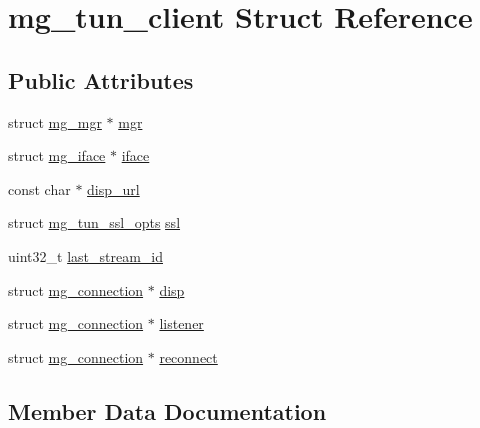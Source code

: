 \hypertarget{structmg__tun__client}{}\section{mg\+\_\+tun\+\_\+client Struct Reference}
\label{structmg__tun__client}
\subsection*{Public Attributes}
\begin{DoxyCompactItemize}
\item 
struct \hyperlink{structmg__mgr}{mg\+\_\+mgr} $\ast$ \hyperlink{structmg__tun__client_a6d8252150b0c44c00f00d2e5ef20d88b_a6d8252150b0c44c00f00d2e5ef20d88b}{mgr}
\item 
struct \hyperlink{structmg__iface}{mg\+\_\+iface} $\ast$ \hyperlink{structmg__tun__client_ad83d50edc28747fbaae7dc914a908e7f_ad83d50edc28747fbaae7dc914a908e7f}{iface}
\item 
const char $\ast$ \hyperlink{structmg__tun__client_ae2702c91d02403ab47e96cfa00748171_ae2702c91d02403ab47e96cfa00748171}{disp\+\_\+url}
\item 
struct \hyperlink{structmg__tun__ssl__opts}{mg\+\_\+tun\+\_\+ssl\+\_\+opts} \hyperlink{structmg__tun__client_a8e2503ec635c4e69b547b6aed64bed37_a8e2503ec635c4e69b547b6aed64bed37}{ssl}
\item 
uint32\+\_\+t \hyperlink{structmg__tun__client_a8f57544d695fdb0377020fe4288e2403_a8f57544d695fdb0377020fe4288e2403}{last\+\_\+stream\+\_\+id}
\item 
struct \hyperlink{structmg__connection}{mg\+\_\+connection} $\ast$ \hyperlink{structmg__tun__client_ab5de89e0196eb61c58d0d015c2355c21_ab5de89e0196eb61c58d0d015c2355c21}{disp}
\item 
struct \hyperlink{structmg__connection}{mg\+\_\+connection} $\ast$ \hyperlink{structmg__tun__client_a023920ae1a96f98f546ea70df7d710df_a023920ae1a96f98f546ea70df7d710df}{listener}
\item 
struct \hyperlink{structmg__connection}{mg\+\_\+connection} $\ast$ \hyperlink{structmg__tun__client_a49657c0a96dc128f11dc2d7658bfd06b_a49657c0a96dc128f11dc2d7658bfd06b}{reconnect}
\end{DoxyCompactItemize}


\subsection{Member Data Documentation}
\mbox{\label{structmg__tun__client_ab5de89e0196eb61c58d0d015c2355c21_ab5de89e0196eb61c58d0d015c2355c21}} 
